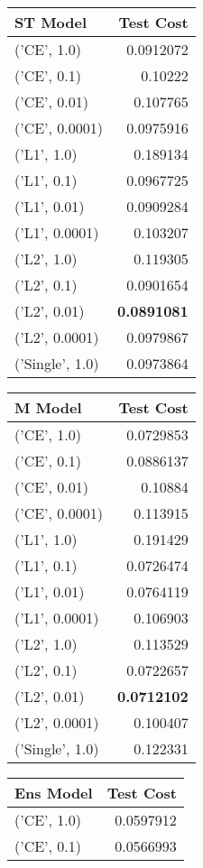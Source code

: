 \begin{tabular}{lr}
\hline
 ST Model        &   Test Cost \\
\hline
 ('CE', 1.0)     &   0.0912072 \\
 ('CE', 0.1)     &   0.10222   \\
 ('CE', 0.01)    &   0.107765  \\
 ('CE', 0.0001)  &   0.0975916 \\
 ('L1', 1.0)     &   0.189134  \\
 ('L1', 0.1)     &   0.0967725 \\
 ('L1', 0.01)    &   0.0909284 \\
 ('L1', 0.0001)  &   0.103207  \\
 ('L2', 1.0)     &   0.119305  \\
 ('L2', 0.1)     &   0.0901654 \\
 ('L2', 0.01)    &   {\bf 0.0891081} \\
 ('L2', 0.0001)  &   0.0979867 \\
 ('Single', 1.0) &   0.0973864 \\
\hline
\end{tabular}\begin{tabular}{lr}
\hline
 M Model         &   Test Cost \\
\hline
 ('CE', 1.0)     &   0.0729853 \\
 ('CE', 0.1)     &   0.0886137 \\
 ('CE', 0.01)    &   0.10884   \\
 ('CE', 0.0001)  &   0.113915  \\
 ('L1', 1.0)     &   0.191429  \\
 ('L1', 0.1)     &   0.0726474 \\
 ('L1', 0.01)    &   0.0764119 \\
 ('L1', 0.0001)  &   0.106903  \\
 ('L2', 1.0)     &   0.113529  \\
 ('L2', 0.1)     &   0.0722657 \\
 ('L2', 0.01)    &  {\bf 0.0712102} \\
 ('L2', 0.0001)  &   0.100407  \\
 ('Single', 1.0) &   0.122331  \\
\hline
\end{tabular}\begin{tabular}{lr}
\hline
 Ens Model       &   Test Cost \\
\hline
 ('CE', 1.0)     &   0.0597912 \\
 ('CE', 0.1)     &   0.0566993 \\

\end{tabular}

